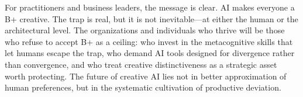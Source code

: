\documentclass[12pt,a4paper]{article}
\begin{document}
For practitioners and business leaders, the message is clear. AI makes everyone a B+ creative. The trap is real, but it is not inevitable---at either the human or the architectural level. The organizations and individuals who thrive will be those who refuse to accept B+ as a ceiling: who invest in the metacognitive skills that let humans escape the trap, who demand AI tools designed for divergence rather than convergence, and who treat creative distinctiveness as a strategic asset worth protecting. The future of creative AI lies not in better approximation of human preferences, but in the systematic cultivation of productive deviation.





\end{document}
